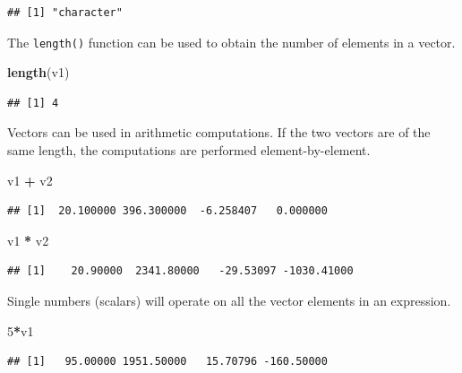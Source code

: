 \documentclass[
]{book}
\newenvironment{Shaded}{\begin{snugshade}}{\end{snugshade}}
\newcommand{\DecValTok}[1]{\textcolor[rgb]{0.00,0.00,0.81}{#1}}
\newcommand{\KeywordTok}[1]{\textcolor[rgb]{0.13,0.29,0.53}{\textbf{#1}}}
\newcommand{\NormalTok}[1]{#1}
\newcommand{\OperatorTok}[1]{\textcolor[rgb]{0.81,0.36,0.00}{\textbf{#1}}}
\newcommand{\StringTok}[1]{\textcolor[rgb]{0.31,0.60,0.02}{#1}}
\begin{document}
\begin{verbatim}
## [1] "character"
\end{verbatim}

The \texttt{length()} function can be used to obtain the number of elements in a vector.

\begin{Shaded}
\begin{Highlighting}[]
\KeywordTok{length}\NormalTok{(v1)}
\end{Highlighting}
\end{Shaded}

\begin{verbatim}
## [1] 4
\end{verbatim}

Vectors can be used in arithmetic computations. If the two vectors are of the same length, the computations are performed element-by-element.

\begin{Shaded}
\begin{Highlighting}[]
\NormalTok{v1 }\OperatorTok{+}\StringTok{ }\NormalTok{v2}
\end{Highlighting}
\end{Shaded}

\begin{verbatim}
## [1]  20.100000 396.300000  -6.258407   0.000000
\end{verbatim}

\begin{Shaded}
\begin{Highlighting}[]
\NormalTok{v1 }\OperatorTok{*}\StringTok{ }\NormalTok{v2}
\end{Highlighting}
\end{Shaded}

\begin{verbatim}
## [1]    20.90000  2341.80000   -29.53097 -1030.41000
\end{verbatim}

Single numbers (scalars) will operate on all the vector elements in an expression.

\begin{Shaded}
\begin{Highlighting}[]
\DecValTok{5}\OperatorTok{*}\NormalTok{v1}
\end{Highlighting}
\end{Shaded}

\begin{verbatim}
## [1]   95.00000 1951.50000   15.70796 -160.50000
\end{verbatim}
\end{document}
